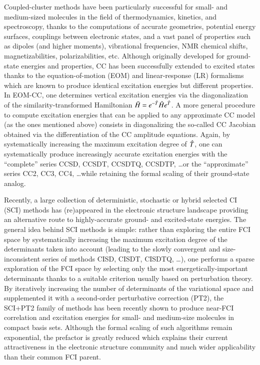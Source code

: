 \documentclass[aip,jcp,reprint,noshowkeys,superscriptaddress]{revtex4-1}
\newcommand{\hH}{\Hat{H}}
\newcommand{\hT}{\Hat{T}}
\newcommand{\bH}{\Bar{H}}
\begin{document}
Coupled-cluster methods have been particularly successful for small- and medium-sized molecules in the field of thermodynamics, kinetics, and spectroscopy, thanks to the computations of accurate geometries, potential energy surfaces, couplings between electronic states, and a vast panel of properties such as dipoles (and higher moments), vibrational frequencies, NMR chemical shifts, magnetizabilities, polarizabilities, etc.
Although originally developed for ground-state energies and properties, CC has been successfully extended to excited states thanks to the equation-of-motion (EOM) and linear-response (LR) formalisms which are known to produce identical excitation energies but different properties.
In EOM-CC, one determines vertical excitation energies via the diagonalization of the similarity-transformed Hamiltonian $\bH = e^{-\hT} \hH e^{\hT}$.
A more general procedure to compute excitation energies that can be applied to any approximate CC model (as the ones mentioned above) consists in diagonalizing the so-called CC Jacobian obtained via the differentiation of the CC amplitude equations.
Again, by systematically increasing the maximum excitation degree of $\hT$, one can systematically produce increasingly accurate excitation energies with the ``complete'' series CCSD, CCSDT, CCSDTQ, CCSDTP, \ldots or the ``approximate'' series CC2, CC3, CC4, \ldots while retaining the formal scaling of their ground-state analog.

Recently, a large collection of deterministic, stochastic or hybrid selected CI (SCI) methods has (re)appeared in the electronic structure landscape providing an alternative route to highly-accurate ground- and excited-state energies.
The general idea behind SCI methods is simple: rather than exploring the entire FCI space by systematically increasing the maximum excitation degree of the determinants taken into account (leading to the slowly convergent and size-inconsistent series of methods CISD, CISDT, CISDTQ, \ldots), one performs a sparse exploration of the FCI space by selecting only the most energetically-important determinants thanks to a suitable criterion usually based on perturbation theory.
By iteratively increasing the number of determinants of the variational space and supplemented it with a second-order perturbative correction (PT2), the SCI+PT2 family of methods has been recently shown to produce near-FCI correlation and excitation energies for small- and medium-size molecules in compact basis sets.
Although the formal scaling of such algorithms remain exponential, the prefactor is greatly reduced which explains their current attractiveness in the electronic structure community and much wider applicability than their common FCI parent.
\end{document}

